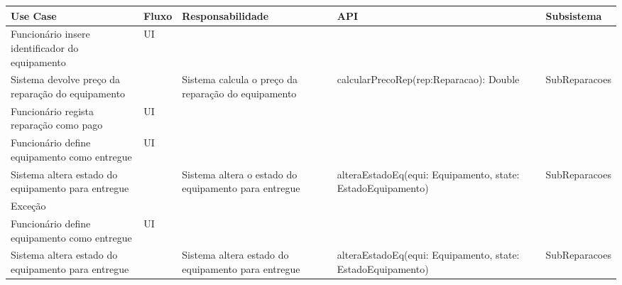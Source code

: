 \documentclass[../relatorio.tex]{subfiles}
\begin{document}
\begin{landscape}
    \begin{table}[!h]
        \centering
        \begin{tabular}{|p{5cm}|p{1cm}|p{4cm}|p{6cm}|p{3cm}|}
            \hline
            \rowcolor{gray!20!white}
            Use Case & Fluxo & Responsabilidade & API & Subsistema \\
            \hline
            \rowcolor{yellow}
            Funcionário insere identificador do equipamento
                     & UI
                     &
                     &
                     &
            \\
            \hline
            Sistema devolve preço da reparação do equipamento
                     &
                     & Sistema calcula o preço da reparação do equipamento
                     & calcularPrecoRep(rep:Reparacao): Double
                     & SubReparacoes
            \\
            \hline
            \rowcolor{yellow}
            Funcionário regista reparação como pago
                     & UI
                     &
                     &
                     &
            \\
            \hline
            \rowcolor{yellow}
            Funcionário define equipamento como entregue
                     & UI
                     &
                     &
                     &
            \\
            \hline
            Sistema altera estado do equipamento para entregue
                     &
                     & Sistema altera o estado do equipamento para entregue
                     & alteraEstadoEq(equi: Equipamento, state: EstadoEquipamento)
                     & SubReparacoes
            \\
            \hline
            \rowcolor{red!30}
            Exceção  &   &   &    & \\
            \hline
            \rowcolor{yellow}
            Funcionário define equipamento como entregue
                    & UI
                    &
                    &
                    &
            \\
            \hline
            Sistema altera estado do equipamento para entregue
                    & 
                    & Sistema altera estado do equipamento para entregue
                    & alteraEstadoEq(equi: Equipamento, state: EstadoEquipamento)
                    & SubReparacoes
            \\
            \hline

\end{tabular}
\end{table}
\end{landscape}
\end{document}
